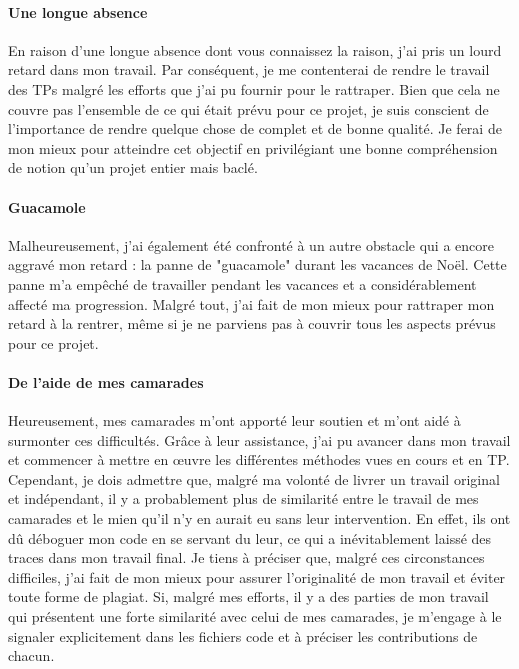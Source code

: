 \documentclass[10pt,a4paper]{article}
\begin{document}
	\paragraph{Une longue absence} %
		En raison d'une longue absence dont vous connaissez la raison, j'ai pris un lourd retard dans mon travail. Par conséquent, je me contenterai de rendre le travail des TPs malgré les efforts que j'ai pu fournir pour le rattraper. Bien que cela ne couvre pas l'ensemble de ce qui était prévu pour ce projet, je suis conscient de l'importance de rendre quelque chose de complet et de bonne qualité. Je ferai de mon mieux pour atteindre cet objectif en privilégiant une bonne compréhension de notion qu'un projet entier mais baclé.

	\paragraph{Guacamole}
		Malheureusement, j'ai également été confronté à un autre obstacle qui a encore aggravé mon retard : la panne de "guacamole" durant les vacances de Noël. Cette panne m'a empêché de travailler pendant les vacances et a considérablement affecté ma progression. Malgré tout, j'ai fait de mon mieux pour rattraper mon retard à la rentrer, même si je ne parviens pas à couvrir tous les aspects prévus pour ce projet.

	\paragraph{De l'aide de mes camarades}
		Heureusement, mes camarades m'ont apporté leur soutien et m'ont aidé à surmonter ces difficultés. Grâce à leur assistance, j'ai pu avancer dans mon travail et commencer à mettre en œuvre les différentes méthodes vues en cours et en TP. Cependant, je dois admettre que, malgré ma volonté de livrer un travail original et indépendant, il y a probablement plus de similarité entre le travail de mes camarades et le mien qu'il n'y en aurait eu sans leur intervention. En effet, ils ont dû déboguer mon code en se servant du leur, ce qui a inévitablement laissé des traces dans mon travail final. Je tiens à préciser que, malgré ces circonstances difficiles, j'ai fait de mon mieux pour assurer l'originalité de mon travail et éviter toute forme de plagiat. Si, malgré mes efforts, il y a des parties de mon travail qui présentent une forte similarité avec celui de mes camarades, je m'engage à le signaler explicitement dans les fichiers code et à préciser les contributions de chacun.
	
\end{document}
